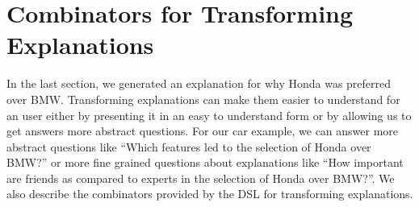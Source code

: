 \documentclass{jfp}
\begin{document}
\section{Combinators for Transforming Explanations}
\label{sec:trans}

In the last section, we generated an explanation for why Honda was preferred over BMW. Transforming explanations can make them easier to understand for an user either by presenting it in an easy to understand form or by allowing us to get answers more abstract questions. For our car example, we can answer more abstract questions like ``Which features led to the selection of Honda over BMW?'' or more fine grained questions about explanations like ``How important are friends as compared to experts in the selection of Honda over BMW?''. We also describe the combinators provided by the DSL for transforming explanations.
\end{document}
